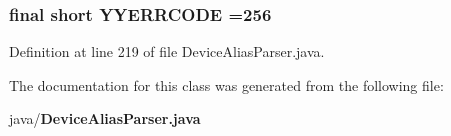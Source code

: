 \subsubsection[{Y\+Y\+E\+R\+R\+C\+O\+D\+E}]{\setlength{\rightskip}{0pt plus 5cm}final short Y\+Y\+E\+R\+R\+C\+O\+D\+E =256\hspace{0.3cm}{\ttfamily [static]}}\label{classorg_1_1smallfoot_1_1parser_1_1zone_1_1DeviceAliasParser_a1c58472ea6621d2f613831e08d10dba3}


Definition at line 219 of file Device\+Alias\+Parser.\+java.



The documentation for this class was generated from the following file\+:\begin{DoxyCompactItemize}
\item 
java/{\bf Device\+Alias\+Parser.\+java}\end{DoxyCompactItemize}
